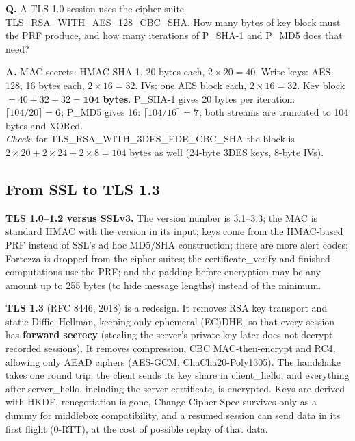\begin{worked}
\textbf{Q.} A TLS 1.0 session uses the cipher suite TLS\_RSA\_WITH\_AES\_128\_CBC\_SHA. How many bytes of key block must the PRF produce, and how many iterations of P\_SHA-1 and P\_MD5 does that need?

\textbf{A.} MAC secrets: HMAC-SHA-1, 20 bytes each, $2 \times 20 = 40$. Write keys: AES-128, 16 bytes each, $2 \times 16 = 32$. IVs: one AES block each, $2 \times 16 = 32$. Key block $= 40 + 32 + 32 = \mathbf{104}$ \textbf{bytes}. P\_SHA-1 gives 20 bytes per iteration: $\lceil 104/20 \rceil = \mathbf{6}$; P\_MD5 gives 16: $\lceil 104/16 \rceil = \mathbf{7}$; both streams are truncated to 104 bytes and XORed.\\
\emph{Check}: for TLS\_RSA\_WITH\_3DES\_EDE\_CBC\_SHA the block is $2 \times 20 + 2 \times 24 + 2 \times 8 = 104$ bytes as well (24-byte 3DES keys, 8-byte IVs).
\end{worked}

\subsection{From SSL to TLS 1.3 \new}

\textbf{TLS 1.0--1.2 versus SSLv3.} The version number is 3.1--3.3; the MAC is standard HMAC with the version in its input; keys come from the HMAC-based PRF instead of SSL's ad hoc MD5/SHA construction; there are more alert codes; Fortezza is dropped from the cipher suites; the certificate\_verify and finished computations use the PRF; and the padding before encryption may be any amount up to 255 bytes (to hide message lengths) instead of the minimum.

\textbf{TLS 1.3} (RFC 8446, 2018) is a redesign. It removes RSA key transport and static Diffie--Hellman, keeping only ephemeral (EC)DHE, so that every session has \textbf{forward secrecy} (stealing the server's private key later does not decrypt recorded sessions). It removes compression, CBC MAC-then-encrypt and RC4, allowing only AEAD ciphers (AES-GCM, ChaCha20-Poly1305). The handshake takes one round trip: the client sends its key share in client\_hello, and everything after server\_hello, including the server certificate, is encrypted. Keys are derived with HKDF, renegotiation is gone, Change Cipher Spec survives only as a dummy for middlebox compatibility, and a resumed session can send data in its first flight (0-RTT), at the cost of possible replay of that data.

